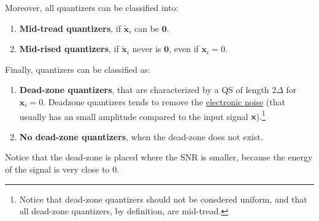 Moreover, all quantizers can be classified into:
\begin{enumerate}
\item \textbf{Mid-tread quantizers}, if $\tilde{{\mathbf x}}_i$ can be ${\mathbf 0}$.
\item \textbf{Mid-rised quantizers}, if $\tilde{{\mathbf x}}_i$ never is ${\mathbf 0}$,
  even if ${\mathbf x}_i=0$.
\end{enumerate}

Finally, quantizers can be classified as:
\begin{enumerate}
\item \textbf{Dead-zone quantizers}, that are characterized by a QS of
  length $2\Delta$ for ${\mathbf x}_i=0$. Deadzone quantizers tends to
  remove the
  \href{https://en.wikipedia.org/wiki/Noise_(electronics)}{electronic
    noise} (that usually has an small amplitude compared to the input
  signal ${\mathbf x}$).\footnote{Notice that dead-zone quantizers
  should not be consdered uniform, and that all dead-zone quantizers,
  by definition, are mid-tread.}
\item \textbf{No dead-zone quantizers}, when the dead-zone does not
  exist.
\end{enumerate}

Notice that the dead-zone is placed where the SNR is smaller, because
the energy of the signal is very close to 0.

\begin{comment}
\begin{figure}
  \centering
  \myfig{io_map_mr}{5cm}{500}
  \caption{Input/output mapping of a mid-riser quantizer with $\Delta=2$.}
  \label{fig:iomap_mr}
\end{figure}

\begin{figure}
  \centering
  \myfig{qe_mr}{5cm}{500}
  \caption{Quantization error of a mid-riser quantizer with $\Delta=2$.}
  \label{fig:qe_mr}
\end{figure}

\begin{figure}
  \centering
  \myfig{io_map_mt}{5cm}{500}
  \caption{Input/output map of a mid-tread quantizer with $\Delta=2$.}
  \label{fig:iomap_mt}
\end{figure}

\begin{figure}
  \centering
  \myfig{qe_mt}{5cm}{500}
  \caption{Quantization error of a mid-tread quantizer with $\Delta=2$.}
  \label{fig:qe_mt}
\end{figure}

\begin{figure}
  \centering
  \myfig{io_map_dz}{5cm}{500}
  \caption{Input/output map of a dead-zone quantizer with $\Delta=2$.}
  \label{fig:iomap_dz}
\end{figure}

\begin{figure}
  \centering
  \myfig{qe_dz}{5cm}{500}
  \caption{Quantization error of a dead-zone quantizer with $\Delta=2$.}
  \label{fig:qe_dz}
\end{figure}
\end{comment}

